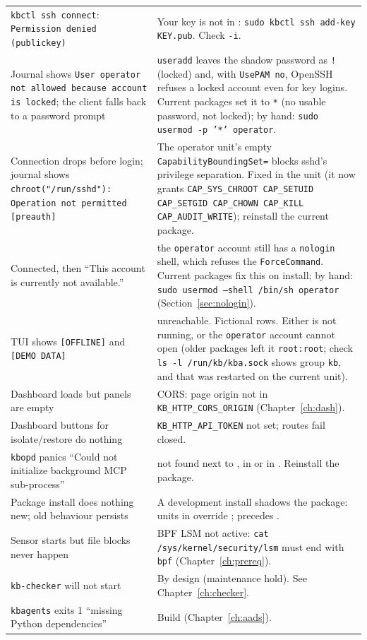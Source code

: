 \begin{center}
\begin{tabularx}{\textwidth}{@{}L{4.5cm}Y@{}}
\texttt{kbctl ssh connect}: \texttt{Permission denied (publickey)} & Your key is not in : \texttt{sudo kbctl ssh add-key KEY.pub}. Check \texttt{-i}.\\
Journal shows \texttt{User operator not allowed because account is locked}; the client falls back to a password prompt & \texttt{useradd} leaves the shadow password as \texttt{!} (locked) and, with \texttt{UsePAM no}, OpenSSH refuses a locked account even for key logins. Current packages set it to \texttt{*} (no usable password, not locked); by hand: \texttt{sudo usermod -p '*' operator}.\\
Connection drops before login; journal shows \texttt{chroot("/run/sshd"): Operation not permitted [preauth]} & The operator  unit's empty \texttt{CapabilityBoundingSet=} blocks sshd's privilege separation. Fixed in the unit (it now grants \texttt{CAP\_SYS\_CHROOT CAP\_SETUID CAP\_SETGID CAP\_CHOWN CAP\_KILL CAP\_AUDIT\_WRITE}); reinstall the current package.\\
Connected, then ``This account is currently not available.'' & the \texttt{operator} account still has a \texttt{nologin} shell, which refuses the \texttt{ForceCommand}. Current packages fix this on install; by hand: \texttt{sudo usermod --shell /bin/sh operator} (Section~\ref{sec:nologin}).\\
TUI shows \texttt{[OFFLINE]} and \texttt{[DEMO DATA]} &  unreachable. Fictional rows. Either  is not running, or the \texttt{operator} account cannot open  (older packages left it \texttt{root:root}; check \texttt{ls -l /run/kb/kba.sock} shows group \texttt{kb}, and that  was restarted on the current unit).\\
Dashboard loads but panels are empty & CORS: page origin not in \texttt{KB\_HTTP\_CORS\_ORIGIN} (Chapter~\ref{ch:dash}).\\
Dashboard buttons for isolate/restore do nothing & \texttt{KB\_HTTP\_API\_TOKEN} not set; routes fail closed.\\
\texttt{kbopd} panics ``Could not initialize background MCP sub-process'' &  not found next to , in  or in . Reinstall the package.\\
Package install does nothing new; old behaviour persists & A development install shadows the package: units in  override ;  precedes .\\
Sensor starts but file blocks never happen & BPF LSM not active: \texttt{cat /sys/kernel/security/lsm} must end with \texttt{bpf} (Chapter~\ref{ch:prereq}).\\
\texttt{kb-checker} will not start & By design (maintenance hold). See Chapter~\ref{ch:checker}.\\
\texttt{kbagents} exits 1 ``missing Python dependencies'' & Build  (Chapter~\ref{ch:aads}).\\
\bottomrule
\end{tabularx}
\end{center}

